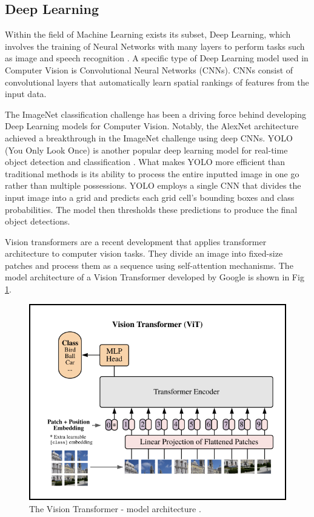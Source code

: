 \subsection{Deep Learning}
Within the field of Machine Learning exists its subset, Deep Learning, which involves the training of Neural Networks with many layers to perform tasks such as image and speech recognition \cite{lecun_bengio_hinton_2015}. A specific type of Deep Learning model used in Computer Vision is Convolutional Neural Networks (CNNs). CNNs consist of convolutional layers that automatically learn spatial rankings of features from the input data.

The ImageNet classification challenge has been a driving force behind developing Deep Learning models for Computer Vision. Notably, the AlexNet architecture \cite{NIPS2012_c399862d} achieved a breakthrough in the ImageNet challenge using deep CNNs. YOLO (You Only Look Once) is another popular deep learning model for real-time object detection and classification \cite{redmon2016}. What makes YOLO more efficient than traditional methods is its ability to process the entire inputted image in one go rather than multiple possessions. YOLO employs a single CNN that divides the input image into a grid and predicts each grid cell's bounding boxes and class probabilities. The model then thresholds these predictions to produce the final object detections.

Vision transformers \cite{DBLP:journals/corr/abs-2010-11929} are a recent development that applies transformer architecture to computer vision tasks. They divide an image into fixed-size patches and process them as a sequence using self-attention mechanisms. The model architecture of a Vision Transformer developed by Google is shown in Fig \ref{fig:3.2}.

\begin{figure}[H]
\begin{center}
\includegraphics[width=0.7\linewidth]{Honors_Thesis/Figures/3.2.png}
\end{center}
\caption{The Vision Transformer - model architecture \cite{DBLP:journals/corr/abs-2010-11929}.}
\label{fig:3.2}
\end{figure}

